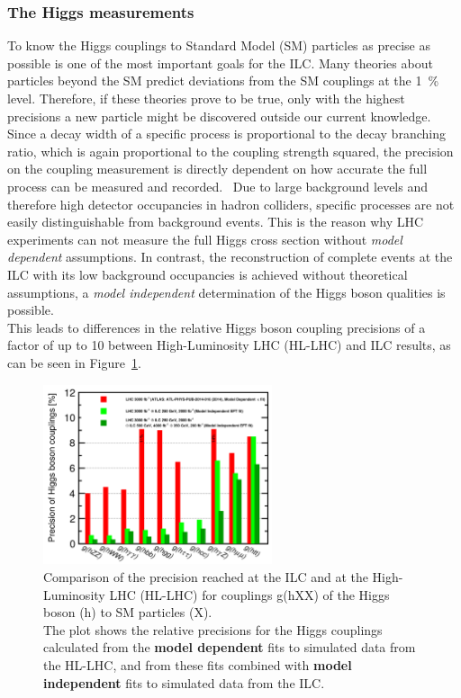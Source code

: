 \subsubsection{The Higgs measurements}
To know the Higgs couplings to Standard Model (SM) particles as precise as possible is one of the most important goals for the ILC.
Many theories about particles beyond the SM predict deviations from the SM couplings at the \SI{1}{\percent} level.
Therefore, if these theories prove to be true, only with the highest precisions a new particle might be discovered outside our current knowledge.\\
Since a decay width of a specific process is proportional to the decay branching ratio, which is again proportional to the coupling strength squared, the precision on the coupling measurement is directly dependent on how accurate the full process can be measured and recorded.~\cite{PhysicsCase}
Due to large background levels and therefore high detector occupancies in hadron colliders, specific processes are not easily distinguishable from background events.
This is the reason why LHC experiments can not measure the full Higgs cross section without \textit{model dependent} assumptions.
In contrast, the reconstruction of complete events at the ILC with its low background occupancies is achieved without theoretical assumptions, a \textit{model independent} determination of the Higgs boson qualities is possible.\\
This leads to differences in the relative Higgs boson coupling precisions of a factor of up to 10 between High-Luminosity LHC (HL-LHC) and ILC results, as can be seen in Figure~\ref{fig:Higgs_couplings}.
\begin{figure}[h]
\centering
\includegraphics[width=0.6\textwidth]{Figures/Higgs_couplings.png}
\caption[Higgs coupling precisions]{Comparison of the precision reached at the ILC and at the High-Luminosity LHC (HL-LHC) for couplings g(hXX) of the Higgs boson (h) to SM particles (X).~\cite[p. 17]{PhysicsCase}\\
The plot shows the relative precisions for the Higgs couplings calculated from the \textbf{model dependent} fits to simulated data from the HL-LHC, and from these fits combined with \textbf{model independent} fits to simulated data from the ILC.}
\label{fig:Higgs_couplings}
\end{figure}

